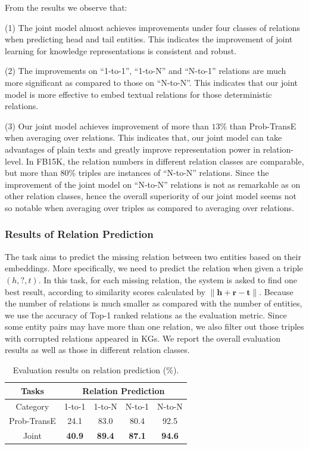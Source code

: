 \documentclass[11pt,a4paper]{article}
\begin{document}
From the results we observe that:

(1) The joint model almost achieves improvements under four classes of relations when predicting head and tail entities. This indicates the improvement of joint learning for knowledge representations is consistent and robust. 

(2) The improvements on ``1-to-1'', ``1-to-N'' and ``N-to-1'' relations are much more significant as compared to those on ``N-to-N''. This indicates that our joint model is more effective to embed textual relations for those deterministic relations.

(3) Our joint model achieves improvement of more than $13\%$ than Prob-TransE when averaging over relations. This indicates that, our joint model can take advantages of plain texts and greatly improve representation power in relation-level. In FB15K, the relation numbers in different relation classes are comparable, but more than $80\%$ triples are instances of ``N-to-N'' relations. Since the improvement of the joint model on ``N-to-N'' relations is not as remarkable as on other relation classes, hence the overall superiority of our joint model seems not so notable when averaging over triples as compared to averaging over relations.

\subsubsection{Results of Relation Prediction}
The task aims to predict the missing relation between two entities based on their embeddings. More specifically, we need to predict the relation when given a triple $(h, ?, t)$. In this task, for each missing relation, the system is asked to find one best result, according to similarity scores calculated by $\lVert \textbf{h} + \textbf{r} - \textbf{t} \rVert$.
Because the number of relations is much smaller as compared with the number of entities, we use the accuracy of Top-1 ranked relations as the evaluation metric. Since some entity pairs may have more than one relation, we also filter out those triples with corrupted relations appeared in KGs. We report the overall evaluation results as well as those in different relation classes.

\begin{table}[htb]
\centering
\small 
\begin{tabular}{|c|c|c|c|c|}
\hline
Tasks             & \multicolumn{4}{c|}{Relation Prediction}                      \\ \hline
Category & 1-to-1     & 1-to-N     & N-to-1     & N-to-N                \\ \hline
Prob-TransE       & 24.1       & 83.0       & 80.4       & 92.5                 \\ \hline
Joint             & \textbf{40.9} & \textbf{89.4} & \textbf{87.1} & \textbf{94.6}  \\ \hline
\end{tabular}
\caption{Evaluation results on relation prediction (\%).}
\label{t:relation}
\end{table}
\end{document}
